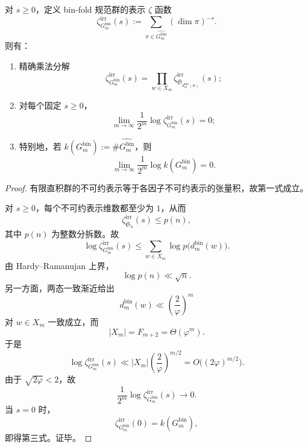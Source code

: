 \begin{theorem}[规范群表象熵的指数塌缩]\label{thm:conclusion-binfold-representation-zeta-entropy-collapse}
对 \(s\ge 0\)，定义 bin-fold 规范群的表示 \(\zeta\) 函数
\[
\zeta_{G_m^{\mathrm{bin}}}^{\mathrm{irr}}(s)
:=
\sum_{\pi\in \widehat{G_m^{\mathrm{bin}}}}(\dim \pi)^{-s}.
\]
则有：
\begin{enumerate}
  \item 精确乘法分解
  \[
  \zeta_{G_m^{\mathrm{bin}}}^{\mathrm{irr}}(s)
  =
  \prod_{w\in X_m}\zeta_{\mathfrak S_{d_m^{\mathrm{bin}}(w)}}^{\mathrm{irr}}(s);
  \]
  \item 对每个固定 \(s\ge 0\)，
  \[
  \lim_{m\to\infty}\frac{1}{2^m}\log \zeta_{G_m^{\mathrm{bin}}}^{\mathrm{irr}}(s)=0;
  \]
  \item 特别地，若 \(k(G_m^{\mathrm{bin}}):=\#\widehat{G_m^{\mathrm{bin}}}\)，则
  \[
  \lim_{m\to\infty}\frac{1}{2^m}\log k(G_m^{\mathrm{bin}})=0.
  \]
\end{enumerate}
\end{theorem}
\begin{proof}
有限直积群的不可约表示等于各因子不可约表示的张量积，故第一式成立。

对 \(s\ge 0\)，每个不可约表示维数都至少为 \(1\)，从而
\[
\zeta_{\mathfrak S_n}^{\mathrm{irr}}(s)\le p(n),
\]
其中 \(p(n)\) 为整数分拆数。故
\[
\log \zeta_{G_m^{\mathrm{bin}}}^{\mathrm{irr}}(s)
\le
\sum_{w\in X_m}\log p\!\bigl(d_m^{\mathrm{bin}}(w)\bigr).
\]
由 Hardy--Ramanujan 上界，
\[
\log p(n)\ll \sqrt n.
\]
另一方面，两态一致渐近给出
\[
d_m^{\mathrm{bin}}(w)\ll \left(\frac{2}{\varphi}\right)^m
\]
对 \(w\in X_m\) 一致成立，而
\[
|X_m|=F_{m+2}=\Theta(\varphi^m).
\]
于是
\[
\log \zeta_{G_m^{\mathrm{bin}}}^{\mathrm{irr}}(s)
\ll
|X_m|\left(\frac{2}{\varphi}\right)^{m/2}
=
O\!\bigl((2\varphi)^{m/2}\bigr).
\]
由于 \(\sqrt{2\varphi}<2\)，故
\[
\frac{1}{2^m}\log \zeta_{G_m^{\mathrm{bin}}}^{\mathrm{irr}}(s)\to 0.
\]
当 \(s=0\) 时，
\[
\zeta_{G_m^{\mathrm{bin}}}^{\mathrm{irr}}(0)=k(G_m^{\mathrm{bin}}),
\]
即得第三式。证毕。
\end{proof}

